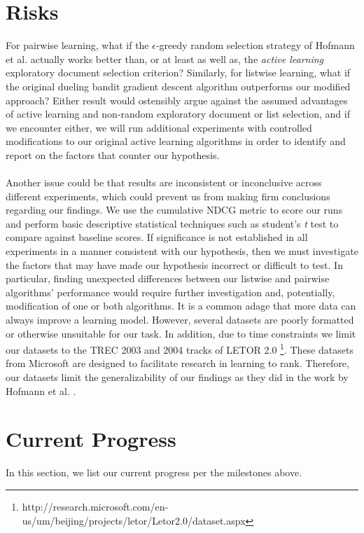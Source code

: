 \documentclass{acm_proc_article-sp}
\begin{document}
\section{Risks}
For pairwise learning, what if the $\epsilon$-greedy random selection strategy of Hofmann et al. \cite{hofmann} actually works better than, or at least as well as, the \emph{active learning} exploratory document selection criterion? Similarly, for listwise learning, what if the original dueling bandit gradient descent algorithm outperforms our modified approach? Either result would ostensibly argue against the assumed advantages of active learning and non-random exploratory document or list selection, and if we encounter either, we will run additional experiments with controlled modifications to our original active learning algorithms in order to identify and report on the factors that counter our hypothesis.\\ \\
Another issue could be that results are inconsistent or inconclusive across different experiments, which could prevent us from making firm conclusions regarding our findings. We use the cumulative NDCG metric to score our runs and perform basic descriptive statistical techniques such as student's \emph{t} test to compare against baseline scores. If significance is not established in all experiments in a manner consistent with our hypothesis, then we must investigate the factors that may have made our hypothesis incorrect or difficult to test. In particular, finding unexpected differences between our listwise and pairwise algorithms' performance would require further investigation and,  potentially, modification of one or both algorithms. It is a common adage that more data can always improve a learning model. However, several datasets are poorly formatted or otherwise unsuitable for our task. In addition, due to time constraints we limit our datasets to the TREC 2003 and 2004 tracks of LETOR 2.0 \footnote{http://research.microsoft.com/en-us/um/beijing/projects/letor/Letor2.0/dataset.aspx}. These datasets from Microsoft are designed to facilitate research in learning to rank. Therefore, our datasets limit the generalizability of our findings as they did in the work by Hofmann et al. \cite{hofmann}.

\section{Current Progress}
In this section, we list our current progress per the milestones above. 
\end{document}
